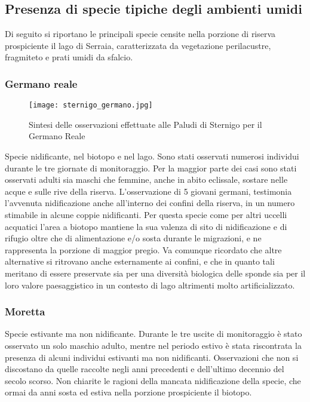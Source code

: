 \documentclass[11pt,a4paper,twoside]{memoir}
\begin{document}
\subsection{Presenza di specie tipiche degli ambienti umidi}
Di seguito si riportano le principali specie censite nella porzione di riserva prospiciente il lago di Serraia, caratterizzata da vegetazione perilacustre, fragmiteto e prati umidi da sfalcio.

\subsubsection{Germano reale}
\vspace*{\fill}
\begin{figure}[H]
  \centering
  \texttt{[image: sternigo\_germano.jpg]}
  \caption{Sintesi delle osservazioni effettuate alle Paludi di Sternigo per il Germano Reale}
\end{figure}\vspace*{\fill}
Specie nidificante, nel biotopo e nel lago. Sono stati osservati numerosi individui durante le tre giornate di monitoraggio. Per la maggior parte dei casi sono stati osservati adulti sia maschi che femmine, anche in abito eclissale, sostare nelle acque e sulle rive della riserva. L’osservazione di 5 giovani germani, testimonia l’avvenuta nidificazione anche all’interno dei confini della riserva, in un numero stimabile in alcune coppie nidificanti. Per questa specie come per altri uccelli acquatici l’area a biotopo mantiene la sua valenza di sito di nidificazione e di rifugio oltre che di alimentazione e/o sosta durante le migrazioni, e ne rappresenta la porzione di maggior pregio. Va comunque ricordato che altre alternative si ritrovano anche esternamente ai confini, e che in quanto tali meritano di essere preservate sia per una diversità biologica delle sponde sia per il loro valore paesaggistico in un contesto di lago altrimenti molto artificializzato.

\subsubsection{Moretta}
Specie estivante ma non nidificante. Durante le tre uscite di monitoraggio è stato osservato un solo maschio adulto, mentre nel periodo estivo è stata riscontrata la presenza di alcuni individui estivanti ma non nidificanti. Osservazioni che non si discostano da quelle raccolte negli anni precedenti e dell’ultimo decennio del secolo scorso. Non chiarite le ragioni della mancata nidificazione della specie, che ormai da anni sosta ed estiva nella porzione prospiciente il biotopo.
\end{document}
